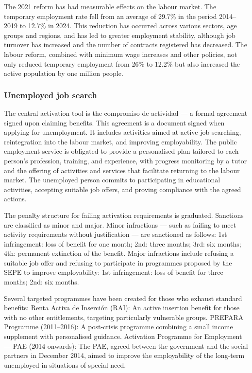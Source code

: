 \documentclass[12pt]{article}
\theoremstyle{definition}
\theoremstyle{remark}
\begin{document}
The 2021 reform has had measurable effects on the labour market. The temporary employment rate fell from an average of 29.7\% in the period 2014–2019 to 12.7\% in 2024. This reduction has occurred across various sectors, age groups and regions, and has led to greater employment stability, although job turnover has increased and the number of contracts registered has decreased. The labour reform, combined with minimum wage increases and other policies, not only reduced temporary employment from 26\% to 12.2\% but also increased the active population by one million people.

\subsubsection{Unemployed job search}
The central activation tool is the compromiso de actividad — a formal agreement signed upon claiming benefits. This agreement is a document signed when applying for unemployment. It includes activities aimed at active job searching, reintegration into the labour market, and improving employability. The public employment service is obligated to provide a personalised plan tailored to each person's profession, training, and experience, with progress monitoring by a tutor and the offering of activities and services that facilitate returning to the labour market. The unemployed person commits to participating in educational activities, accepting suitable job offers, and proving compliance with the agreed actions.

The penalty structure for failing activation requirements is graduated. Sanctions are classified as minor and major. Minor infractions — such as failing to meet activity requirements without justification — are sanctioned as follows: 1st infringement: loss of benefit for one month; 2nd: three months; 3rd: six months; 4th: permanent extinction of the benefit. Major infractions include refusing a suitable job offer and refusing to participate in programmes proposed by the SEPE to improve employability: 1st infringement: loss of benefit for three months; 2nd: six months.

Several targeted programmes have been created for those who exhaust standard benefits:
Renta Activa de Inserción (RAI): An active insertion benefit for those with no other entitlements, targeting particularly vulnerable groups. 
PREPARA Programme (2011–2016): A post-crisis programme combining a small income supplement with personalised guidance. 
Activation Programme for Employment — PAE (2014 onwards): The PAE, agreed between the government and the social partners in December 2014, aimed to improve the employability of the long-term unemployed in situations of special need. 
\end{document}
